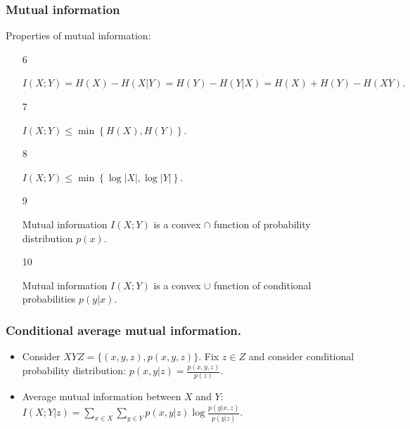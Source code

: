 \documentclass[14pt]{beamer}
\begin{document}
\begin{frame}
\frametitle{Mutual information}
Properties of mutual information:

\begin{enumerate}

    \item[6]
    \begin{prop} \label{p5_6}
    $I(X;Y) = H(X) - H(X\vert Y) = H(Y) - H(Y\vert X) =H(X) + H(Y) - H(XY).$
    \end{prop}


    \pause \item[7]
    \begin{prop} \label{p5_7}
    $I(X;Y) \le \min \left\{ {H(X),H(Y)} \right\}.$
    \end{prop}

    \pause \item[8]
    \begin{prop} \label{p5_8}
    $I(X;Y) \le \min \left\{ {\log \vert X\vert ,\log \vert Y\vert } \right\}.$
    \end{prop}

    \pause \item[9]
    \begin{prop}  \label{p5_9}
    Mutual information $I(X;Y)$ is a convex $ \cap $ function of probability distribution $p(x)$.
    \end{prop}

    \pause \item[10]
    \begin{prop}  \label{p5_10}
    Mutual information $I(X;Y)$ is a convex $ \cup $ function of conditional probabilities $p(y\vert x)$.
    \end{prop}


\end{enumerate}
\end{frame}


\begin{frame}
\frametitle{Conditional average mutual information.}
\begin{itemize}
    \item
    Consider $XYZ = \{(x,y,z),p(x,y,z)\}.$
    Fix $z \in Z$ and consider conditional probability distribution:
    $p(x,y\vert z) = \frac{p(x,y,z)}{p(z)}.$

    \item
    Average mutual information between $X$ and $Y$:
    $ I(X;Y\vert z) = \sum\limits_{x \in X} {\sum\limits_{y \in Y} {p(x,y\vert z)\log \frac{p(y\vert x,z)}{p(y\vert z)}} }.$

\end{itemize}
\end{frame}
\end{document}

